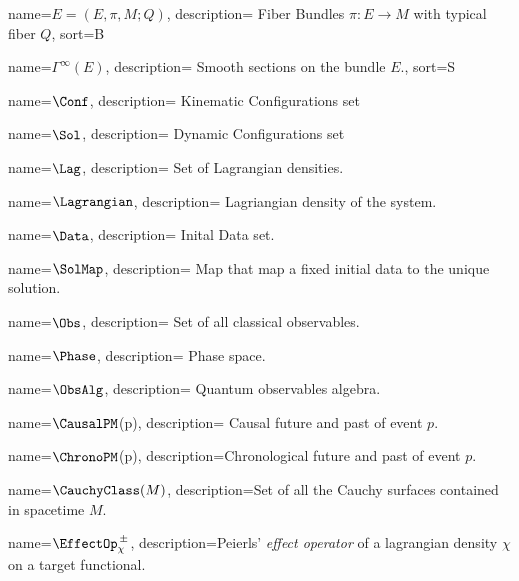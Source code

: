 \usepackage{glossaries}

\makenoidxglossaries


%
{%
	name={\ensuremath{E = (E,\pi , M;Q)}},
	description={ Fiber Bundles $\pi: E\rightarrow M$ with typical fiber $Q$},
    sort={B}
}

%
{%
	name={\ensuremath{\Gamma^\infty(E)}},
	description={ Smooth sections on the bundle $E$.},
    sort={S}
}


	{%
		name={\ensuremath{\Conf}},
		description={ Kinematic Configurations set}
	}

	{%
		name={\ensuremath{\Sol}},
		description={ Dynamic Configurations set}
	}

		
	{%
		name={\ensuremath{\Lag}},
		description={ Set of Lagrangian densities.}
	}
		
	{%
		name={\ensuremath{\Lagrangian}},
		description={ Lagriangian density of the system.}
	}
		
	{%
		name={\ensuremath{\Data}},
		description={ Inital Data set.}
	}
		
	{%
		name={\ensuremath{\SolMap}},
		description={ Map that map a fixed initial data to the unique solution.}
	}
		
	{%
		name={\ensuremath{\Obs}},
		description={ Set of all classical observables.}
	}

	{%
		name={\ensuremath{\Phase}},
		description={ Phase space.}
	}
	
	{%
		name={\ensuremath{\ObsAlg}},
		description={ Quantum observables algebra.}
	}
	
	{%
		name={\ensuremath{\CausalPM}(p)},
		description={ Causal future and past of event $p$.}
	}	

	{%
		name={\ensuremath{\ChronoPM}(p)},
		description={Chronological future and past of event $p$.}
	}

	{%
		name={\ensuremath{\CauchyClass(M)}},
		description={Set of all the Cauchy surfaces contained in spacetime $M$.}
	}
	
	{%
		name={\ensuremath{\EffectOp_\chi^{\, \pm}}},
		description={Peierls' \emph{effect operator} of a lagrangian density $\chi$ on a target functional.}
	}